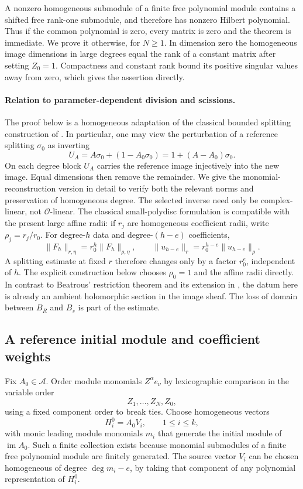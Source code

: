 \documentclass[11pt,reqno]{amsart}
\numberwithin{equation}{section}
\theoremstyle{definition}
\theoremstyle{remark}
\begin{document}
A nonzero homogeneous submodule of a finite free polynomial module
contains a shifted free rank-one submodule, and therefore has nonzero
Hilbert polynomial. Thus if the common polynomial is zero, every
matrix is zero and the theorem is immediate. We prove it otherwise,
for $N\ge1$. In dimension zero the homogeneous image dimensions
in large degrees equal the rank of a constant matrix after setting
$Z_0=1$. Compactness and constant rank bound its positive singular
values away from zero, which gives the assertion directly.

\paragraph{Relation to parameter-dependent division and scissions.}
The proof below is a homogeneous adaptation of the classical bounded
splitting construction of \cite{Galligo,HauserMueller}. In particular,
one may view the perturbation of a reference splitting $\sigma_0$ as
inverting
\[
 U_A=A\sigma_0+(1-A_0\sigma_0)=1+(A-A_0)\sigma_0.
\]
On each degree block $U_A$ carries the reference image injectively into
the new image. Equal dimensions then remove the remainder. We give the
monomial-reconstruction version in detail to verify both the relevant
norms and preservation of homogeneous degree. The selected inverse
need only be complex-linear, not $\mathcal O$-linear. The classical
small-polydisc formulation is compatible with the present large affine
radii: if $r_j$ are homogeneous coefficient radii, write
$\rho_j=r_j/r_0$. For degree-$h$ data and degree-$(h-e)$ coefficients,
\[
 \|F_h\|_{r,\eta}=r_0^h\|F_h\|_{\rho,\eta},\qquad
 \|u_{h-e}\|_r=r_0^{h-e}\|u_{h-e}\|_\rho.
\]
A splitting estimate at fixed $r$ therefore changes only by a factor
$r_0^e$, independent of $h$. The explicit construction below chooses
$\rho_0=1$ and the affine radii directly. In contrast to
Beatrous' restriction theorem \cite{Beatrous} and its extension in
\cite{DouglasTangYu}, the datum here is already an ambient holomorphic
section in the image sheaf. The loss of domain between $B_R$ and $B_s$
is part of the estimate.

\subsection{A reference initial module and coefficient weights}

Fix \(A_0\in\mathcal A\). Order module monomials \(Z^\alpha e_\nu\)
by lexicographic comparison in the variable order
\[
 Z_1,\ldots,Z_N,Z_0,
\]
using a fixed component order to break ties. Choose homogeneous
vectors
\[
 H_i^0=A_0V_i,\qquad 1\leq i\leq k,
\]
with monic leading module monomials \(m_i\) that generate the initial
module of \(\operatorname{im}A_0\). Such a finite collection exists
because monomial submodules of a finite free polynomial module are
finitely generated. The source vector \(V_i\) can be chosen
homogeneous of degree \(\deg m_i-e\), by taking that component of
any polynomial representation of \(H_i^0\).
\end{document}
